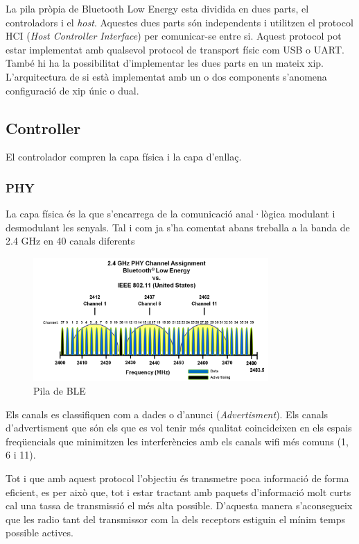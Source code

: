 La pila pròpia de Bluetooth Low Energy esta dividida en dues parts, el controladors i el \textit{host}. Aquestes dues parts són independents i utilitzen el protocol HCI (\textit{Host Controller Interface}) per comunicar-se entre si. Aquest protocol pot estar implementat amb qualsevol protocol de transport físic com USB o UART. També hi ha la possibilitat d'implementar les dues parts en un mateix xip. L'arquitectura de si està implementat amb un o dos components s'anomena configuració de xip únic o dual.


\subsection{Controller}
El controlador compren la capa física i la capa d'enllaç.

\subsubsection{PHY}
La capa física és la que s'encarrega de la comunicació anal·lògica modulant i desmodulant les senyals.
Tal i com ja s'ha comentat abans treballa a la banda de 2.4 GHz en 40 canals diferents

\begin{figure}[h!]
	\begin{center}
		\includegraphics[width=0.8\textwidth]{./images/ble_channel_assignment.png}
		\caption{Pila de BLE \cite{ble_stack}}
		\label{ble_stack}
	\end{center}
\end{figure}

Els canals es classifiquen com a dades o d'anunci (\textit{Advertisment}). Els canals d'advertisment que són els que es vol tenir més qualitat coincideixen en els espais freqüencials que minimitzen les interferències amb els canals wifi més comuns (1, 6 i 11).

Tot i que amb aquest protocol l'objectiu és transmetre poca informació de forma eficient, es per això que, tot i estar tractant amb paquets d'informació molt curts cal una tassa de transmissió el més alta possible. D'aquesta manera s'aconsegueix que les radio tant del transmissor com la dels receptors estiguin el mínim temps possible actives.

